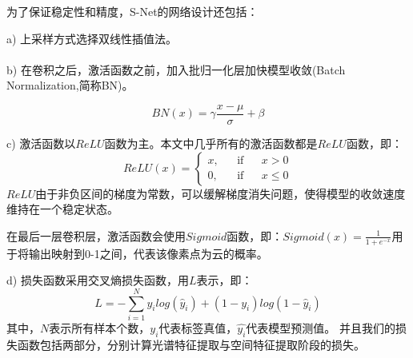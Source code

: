 \documentclass[10pt,UTF8,fntef]{ctexart}
\newcommand{\upcite}[1]{\textsuperscript{\textsuperscript{\cite{#1}}}}
\begin{document}
\begin{multicols}{2}
为了保证稳定性和精度，S-Net的网络设计还包括：

a) 上采样方式选择双线性插值法。

b) 在卷积之后，激活函数之前，加入批归一化层\upcite{ioffe2015batch}加快模型收敛(Batch Normalization,简称BN)。

\begin{equation}
    {BN}(x) = \gamma\frac{x-\mu}{\sigma}+\beta
\end{equation}

c) 激活函数以$ReLU$函数为主。本文中几乎所有的激活函数都是$ReLU$函数，即：
\begin{equation}
    {ReLU}(x)=\left\{
    \begin{aligned}
        x, & &\text{if} & & x > 0 \\
        0, & &\text{if} & & x \leq 0
    \end{aligned}
    \right.
\end{equation}
$ReLU$由于非负区间的梯度为常数，可以缓解梯度消失问题，使得模型的收敛速度维持在一个稳定状态。

在最后一层卷积层，激活函数会使用$Sigmoid$函数，即：${Sigmoid}(x)=\frac{1}{1+e^{-x}}$用于将输出映射到0-1之间，代表该像素点为云的概率。

d) 损失函数采用交叉熵损失函数，用$L$表示，即：
\begin{equation}
    {L} = -\sum_{i=1}^N y_ilog(\hat{y}_i)+(1-y_i)log(1-\hat{y}_i)
\end{equation}
其中，$N$表示所有样本个数，$y_i$代表标签真值，$\hat{y_i}$代表模型预测值。
并且我们的损失函数包括两部分，分别计算光谱特征提取与空间特征提取阶段的损失。


\end{multicols}
\end{document}

